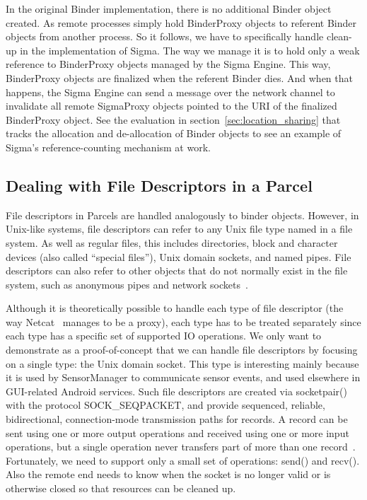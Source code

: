 \documentclass[prodmode]{acmlarge}
\begin{document}
In the original Binder implementation, there is no additional Binder object created. As remote processes simply hold BinderProxy objects to referent Binder objects from another process. So it follows, we have to specifically handle clean-up in the implementation of Sigma. The way we manage it is to hold only a weak reference to BinderProxy objects managed by the Sigma Engine. This way, BinderProxy objects are finalized when the referent Binder dies. And when that happens, the Sigma Engine can send a message over the network channel to invalidate all remote SigmaProxy objects pointed to the URI of the finalized BinderProxy object. See the evaluation in section~\ref{sec:location_sharing} that tracks the allocation and de-allocation of Binder objects to see an example of Sigma's reference-counting mechanism at work.

\subsection{Dealing with File Descriptors in a Parcel}
File descriptors in Parcels are handled analogously to binder objects. However, in Unix-like systems, file descriptors can refer to any Unix file type named in a file system. As well as regular files, this includes directories, block and character devices (also called ``special files''), Unix domain sockets, and named pipes. File descriptors can also refer to other objects that do not normally exist in the file system, such as anonymous pipes and network sockets~\cite{UnixDomainSocket}.

Although it is theoretically possible to handle each type of file descriptor (the way Netcat~\cite{NetCatProxy} manages to be a proxy), each type has to be treated separately since each type has a specific set of supported IO operations. We only want to demonstrate as a proof-of-concept that we can handle file descriptors by focusing on a single type: the Unix domain socket. This type is interesting mainly because it is used by SensorManager to communicate sensor events, and used elsewhere in GUI-related Android services. Such file descriptors are created via socketpair() with the protocol SOCK\_SEQPACKET, and provide sequenced, reliable, bidirectional, connection-mode transmission paths for records. A record can be sent using one or more output operations and received using one or more input operations, but a single operation never transfers part of more than one record~\cite{SocketManPage}. Fortunately, we need to support only a small set of operations: send() and recv(). Also the remote end needs to know when the socket is no longer valid or is otherwise closed so that resources can be cleaned up.
\end{document}
